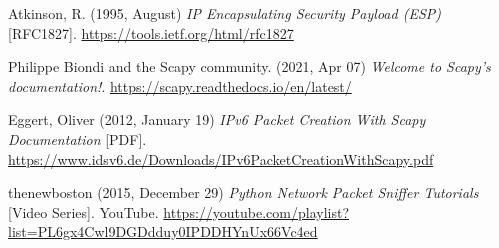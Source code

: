 \documentclass[12pt]{article}
\begin{document}
\label{cit12} \noindent [12] \tabto{2em} Atkinson, R. (1995, August) \textit{IP Encapsulating Security Payload (ESP)} [RFC1827]. \url{https://tools.ietf.org/html/rfc1827}

\label{cit13} \noindent [13] \tabto{2em} Philippe Biondi and the Scapy community. (2021, Apr 07) \textit{Welcome to Scapy’s documentation!}. \url{https://scapy.readthedocs.io/en/latest/}

\label{cit14} \noindent [14] \tabto{2em} Eggert, Oliver (2012, January 19) \textit{IPv6 Packet Creation With Scapy
Documentation} [PDF]. \url{https://www.idsv6.de/Downloads/IPv6PacketCreationWithScapy.pdf}

\label{cit15} \noindent [15] \tabto{2em} thenewboston (2015, December 29) \textit{Python Network Packet Sniffer Tutorials} [Video Series]. YouTube. \url{https://youtube.com/playlist?list=PL6gx4Cwl9DGDdduy0IPDDHYnUx66Vc4ed}
\end{document}
